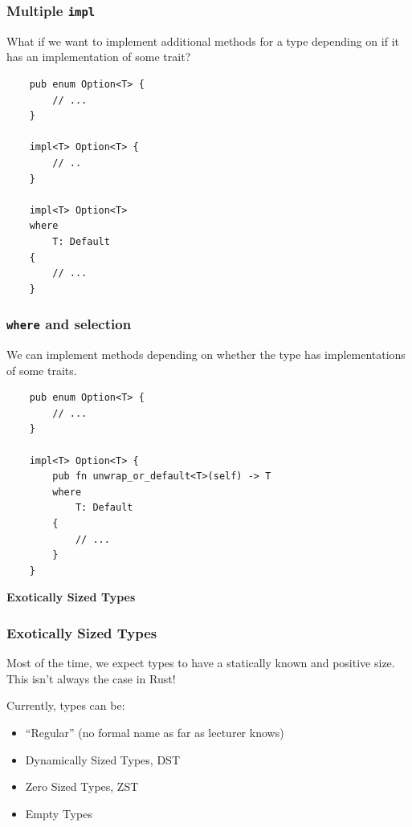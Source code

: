 \documentclass[aspectratio=1610,t]{beamer}
\begin{document}
\begin{frame}[fragile]
\frametitle{Multiple \texttt{impl}}
What if we want to implement additional methods for a type depending on if it has an implementation of some trait?

\begin{verbatim}
    pub enum Option<T> {
        // ...
    }

    impl<T> Option<T> {
        // ..
    }

    impl<T> Option<T>
    where
        T: Default
    {
        // ...
    }
\end{verbatim}
\end{frame}


\begin{frame}[fragile]
\frametitle{\texttt{where} and selection}
We can implement methods depending on whether the type has implementations of some traits.

\begin{verbatim}
    pub enum Option<T> {
        // ...
    }

    impl<T> Option<T> {
        pub fn unwrap_or_default<T>(self) -> T
        where
            T: Default
        {
            // ...
        }
    }
\end{verbatim}
\end{frame}


\begin{frame}[c]
\centering\Huge\textbf{Exotically Sized Types}
\end{frame}


\begin{frame}[fragile]
\frametitle{Exotically Sized Types}
Most of the time, we expect types to have a statically known and positive size. This isn't always the case in Rust!

Currently, types can be:

\begin{itemize}
    \item ``Regular'' (no formal name as far as lecturer knows)
    \item Dynamically Sized Types, DST
    \item Zero Sized Types, ZST
    \item Empty Types
\end{itemize}
\end{frame}
\end{document}
